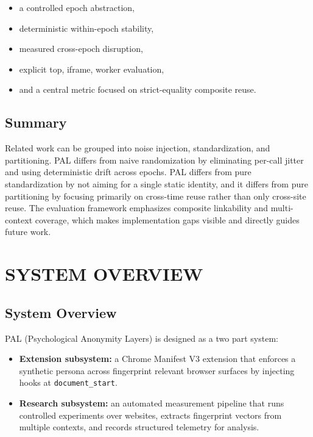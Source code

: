 \documentclass[11pt]{report}
\begin{document}
\begin{itemize}
    \item a controlled epoch abstraction,
    \item deterministic within-epoch stability,
    \item measured cross-epoch disruption,
    \item explicit top, iframe, worker evaluation,
    \item and a central metric focused on strict-equality composite reuse.
\end{itemize}

\section{Summary}

Related work can be grouped into noise injection, standardization, and partitioning. PAL differs from naive randomization by eliminating per-call jitter and using deterministic drift across epochs. PAL differs from pure standardization by not aiming for a single static identity, and it differs from pure partitioning by focusing primarily on cross-time reuse rather than only cross-site reuse. The evaluation framework emphasizes composite linkability and multi-context coverage, which makes implementation gaps visible and directly guides future work.

\clearpage










\chapter{SYSTEM OVERVIEW}

\section{System Overview}

PAL (Psychological Anonymity Layers) is designed as a two part system:

\begin{itemize}
    \item \textbf{Extension subsystem:} a Chrome Manifest V3 extension that enforces a synthetic persona across fingerprint relevant browser surfaces by injecting hooks at \texttt{document\_start}.
    \item \textbf{Research subsystem:} an automated measurement pipeline that runs controlled experiments over websites, extracts fingerprint vectors from multiple contexts, and records structured telemetry for analysis.
\end{itemize}
\end{document}
